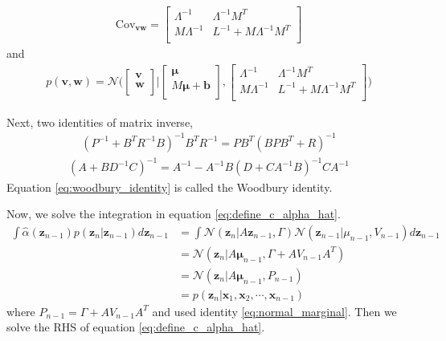 \documentclass[a4]{article}
\begin{document}
\begin{equation}
\begin{aligned}
\text{Cov}_{\bm{v}\bm{w}} =
\begin{bmatrix}
\Lambda^{-1}  & \Lambda^{-1}M^T\\
M\Lambda^{-1} & L^{-1} + M\Lambda^{-1}M^T\\
\end{bmatrix}
\end{aligned}
\end{equation}
and
\begin{equation}
\begin{aligned}
p(\bm{v}, \bm{w}) = \mathcal{N}\Big(
\begin{bmatrix}
\bm{v}\\
\bm{w}\\
\end{bmatrix}
\Big| 
\begin{bmatrix}
\bm{\mu}\\
M\bm{\mu} + \bm{b}\\
\end{bmatrix}
,
\begin{bmatrix}
\Lambda^{-1}  & \Lambda^{-1}M^T\\
M\Lambda^{-1} & L^{-1} + M\Lambda^{-1}M^T\\
\end{bmatrix}
\Big)\label{dq:gaussian_joint}
\end{aligned}
\end{equation}

Next, two identities of matrix inverse,
\begin{equation}
\begin{aligned}
(P^{-1} + B^TR^{-1}B)^{-1}B^TR^{-1} = PB^T(BPB^T + R)^{-1}\label{eq:matrix_inverse1}
\end{aligned}
\end{equation}
\begin{equation}
\begin{aligned}
(A+BD^{-1}C)^{-1} = A^{-1} - A^{-1}B(D+ CA^{-1}B)^{-1}CA^{-1}\label{eq:woodbury_identity}
\end{aligned}
\end{equation}
Equation \ref{eq:woodbury_identity} is called the Woodbury identity.

Now, we solve the integration in equation \ref{eq:define_c_alpha_hat}.
\begin{equation}
\begin{aligned}
\int\hat{\alpha}(\bm{z}_{n-1})p(\bm{z}_n|\bm{z}_{n-1})d\bm{z}_{n-1} &= 
\int\mathcal{N}(\bm{z}_n|A\bm{z}_{n-1}, \Gamma)\mathcal{N}(\bm{z}_{n-1}| \mu_{n-1}, V_{n-1})d\bm{z}_{n-1}\\
&= \mathcal{N}(\bm{z}_n|A\bm{\mu}_{n-1}, \Gamma + AV_{n-1}A^T)\\
&= \mathcal{N}(\bm{z}_n|A\bm{\mu}_{n-1}, P_{n-1})\\
&= p(\bm{z}_n|\bm{x}_1, \bm{x}_2, \cdots, \bm{x}_{n-1})
\end{aligned}
\end{equation}
where $P_{n-1} = \Gamma + AV_{n-1}A^T$ and used identity \ref{eq:normal_marginal}.
Then we solve the RHS of equation \ref{eq:define_c_alpha_hat}.
\end{document}
